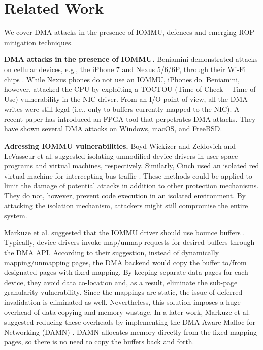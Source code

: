 \section{Related Work}
We cover DMA attacks in the presence of IOMMU, defences and emerging ROP mitigation techniques.

\smallskip
\noindent\textbf{DMA attacks in the presence of IOMMU.}
Beniamini demonstrated attacks on cellular devices, e.g., the iPhone 7 and Nexus 5/6/6P, through their Wi-Fi chips \cite{Ben17a, Ben17b}. While Nexus phones do not use an IOMMU, iPhones do. Beniamini, however, attacked the CPU by exploiting a TOCTOU (Time of Check – Time of Use) vulnerability in the NIC driver. From an I/O point of view, all the DMA writes were still legal (i.e., only to buffers currently mapped to the NIC). A recent paper \cite{thunder} has introduced an FPGA tool that perpetrates DMA attacks. They have shown several \simple DMA attacks on Windows, macOS, and FreeBSD.

\smallskip
\noindent\textbf{Adressing IOMMU vulnerabilities.}
Boyd-Wickizer and Zeldovich \cite{BWZ10} and LeVasseur et al. \cite{LUSG04} suggested isolating unmodified device drivers in user space programs and virtual machines, respectively. Similarly, Cinch used an isolated red virtual machine for intercepting bus traffic \cite{AWH16}. These methods could be applied to limit the damage of potential attacks in addition to other protection mechanisms. They do not, however, prevent code execution in an isolated environment. By attacking the isolation mechanism, attackers might still compromise the entire system.

Markuze et al. suggested that the IOMMU driver should use bounce buffers \cite{MMT16}. Typically, device drivers invoke map/unmap requests for desired buffers through the DMA API. According to their suggestion, instead of dynamically mapping/unmapping pages, the DMA backend would copy the buffer to/from designated pages with fixed mapping. By keeping separate data pages for each device, they avoid data co-location and, as a result, eliminate the sub-page granularity vulnerability. Since the mappings are static, the issue of deferred invalidation is eliminated as well. %
Nevertheless, this solution imposes a huge overhead of data copying and memory wastage. In a later work, Markuze et al. suggested reducing these overheads by implementing the DMA-Aware Malloc for Networking (DAMN) \cite{MSMT18}. DAMN allocates memory directly from the fixed-mapping pages, so there is no need to copy the buffers back and forth. 

